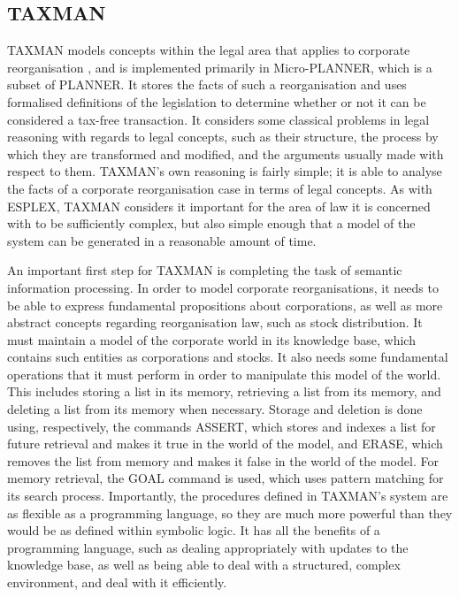 \documentclass{l4proj}
\begin{document}
\subsection{TAXMAN}
TAXMAN models concepts within the legal area that applies to corporate reorganisation \cite{TAXMAN}, and is implemented primarily in Micro-PLANNER, which is a subset of PLANNER. It stores the facts of such a reorganisation and uses formalised definitions of the legislation to determine whether or not it can be considered a tax-free transaction. It considers some classical problems in legal reasoning with regards to legal concepts, such as their structure, the process by which they are transformed and modified, and the arguments usually made with respect to them. TAXMAN's own reasoning is fairly simple; it is able to analyse the facts of a corporate reorganisation case in terms of legal concepts. As with ESPLEX, TAXMAN considers it important for the area of law it is concerned with to be sufficiently complex, but also simple enough that a model of the system can be generated in a reasonable amount of time. 

An important first step for TAXMAN is completing the task of semantic information processing. In order to model corporate reorganisations, it needs to be able to express fundamental propositions about corporations, as well as more abstract concepts regarding reorganisation law, such as stock distribution. It must maintain a model of the corporate world in its knowledge base, which contains such entities as corporations and stocks. It also needs some fundamental operations that it must perform in order to manipulate this model of the world. This includes storing a list in its memory, retrieving a list from its memory, and deleting a list from its memory when necessary. Storage and deletion is done using, respectively, the commands ASSERT, which stores and indexes a list for future retrieval and makes it true in the world of the model, and ERASE, which removes the list from memory and makes it false in the world of the model. For memory retrieval, the GOAL command is used, which uses pattern matching for its search process. Importantly, the procedures defined in TAXMAN's system are as flexible as a programming language, so they are much more powerful than they would be as defined within symbolic logic. It has all the benefits of a programming language, such as dealing appropriately with updates to the knowledge base, as well as being able to deal with a structured, complex environment, and deal with it efficiently. 
\end{document}
